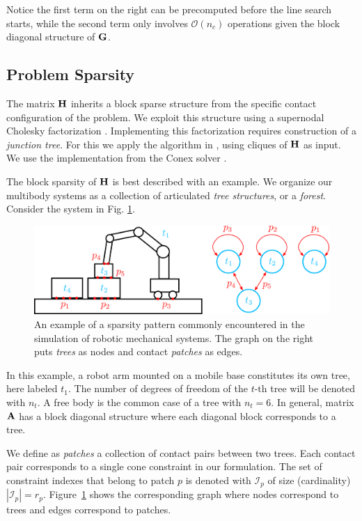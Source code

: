Notice the first term on the right can be precomputed before the line search
 starts, while the second term only involves $\mathcal{O}(n_c)$ operations given
 the block diagonal structure of ${\mathbf{G}}$.

\subsection{Problem Sparsity}
\label{sec:problem_sparsity}

The matrix ${\mathbf{H}}$ inherits a block sparse structure from the specific contact
configuration of the problem. We exploit this structure using a supernodal
Cholesky factorization \cite[\S 9]{bib:davis2016survey}. Implementing this
factorization requires construction of a \emph{junction tree}.  For this we
apply the algorithm in \cite{bib:smail2017junction}, using cliques of ${\mathbf{H}}$
as input. We use the implementation from the Conex solver
\cite{bib:permenter2020}.

The block sparsity of ${\mathbf{H}}$  is best described with an example. We organize
our multibody systems as a collection of articulated \emph{tree structures}, or
a \emph{forest}. Consider the system in Fig. \ref{fig:sparsity_example}.
\begin{figure}[!h]
	\centering
	\includegraphics[width=0.9\columnwidth]{figures/schematics/sparsity_example.png}
	\caption{\label{fig:sparsity_example} 
	An example of a sparsity pattern commonly encountered in the simulation of
	robotic mechanical systems. The graph on the right puts \textit{trees} as
	nodes and contact \textit{patches} as edges.}
\end{figure}
In this example, a robot arm mounted on a mobile base constitutes its own tree,
here labeled $t_1$. The number of degrees of freedom of the $t\text{-th}$ tree
will be denoted with $n_t$. A free body is the common case of a tree with
$n_t=6$. In general, matrix ${\mathbf{A}}$ has a block diagonal structure where each
diagonal block corresponds to a tree.

We define as \textit{patches} a collection of contact pairs between two trees.
Each contact pair corresponds to a single cone constraint in our formulation.
The set of constraint indexes that belong to patch $p$ is denoted with
$\mathcal{I}_p$ of size (cardinality) $|\mathcal{I}_p| = r_p$.
Figure~\ref{fig:sparsity_example} shows the corresponding graph where nodes
correspond to trees and edges correspond to patches.

